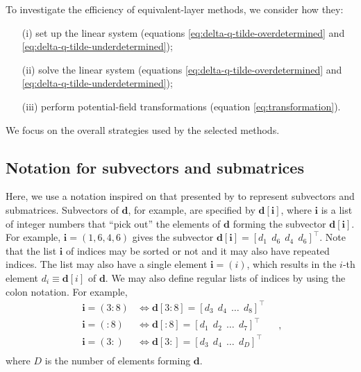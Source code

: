 To investigate the efficiency of equivalent-layer methods, we consider how they:
\begin{itemize}
	\item[(i)] set up the linear system (equations \ref{eq:delta-q-tilde-overdetermined} and \ref{eq:delta-q-tilde-underdetermined});
	\item[(ii)] solve the linear system (equations \ref{eq:delta-q-tilde-overdetermined} and \ref{eq:delta-q-tilde-underdetermined});
	\item[(iii)] perform potential-field transformations (equation \ref{eq:transformation}).
\end{itemize}
We focus on the overall strategies used by the selected methods.

\subsection{Notation for subvectors and submatrices}

Here, we use a notation inspired on that presented by \cite[][p. 4]{vanloan1992} to represent subvectors and submatrices.
Subvectors of $\mathbf{d}$, for example, are specified by $\mathbf{d}[\mathbf{i}]$, where $\mathbf{i}$ is a
list of integer numbers that ``pick out'' the elements of $\mathbf{d}$ forming the subvector $\mathbf{d}[\mathbf{i}]$.
For example, $\mathbf{i} = (1, 6, 4, 6)$ gives the subvector $\mathbf{d}[\mathbf{i}] = [ d_{1} \:\: d_{6} \:\: d_{4} \:\: d_{6} ]^{\top} $.
Note that the list $\mathbf{i}$ of indices may be sorted or not and it may also have repeated indices.
The list may also have a single element $\mathbf{i} = (i)$, which results in the $i$-th element $d_{i} \equiv \mathbf{d}[i]$ of $\mathbf{d}$.
We may also define regular lists of indices by using the colon notation. For example, 
\begin{equation*}
	\begin{split}
		\mathbf{i} = (3:8) &\Leftrightarrow \mathbf{d}[3:8] = [ d_{3} \:\: d_{4} \:\: \dots \:\: d_{8} ]^{\top} \\
		\mathbf{i} = (:8) &\Leftrightarrow \mathbf{d}[:8] = [ d_{1} \:\: d_{2} \:\: \dots \:\: d_{7} ]^{\top} \\
		\mathbf{i} = (3:) &\Leftrightarrow \mathbf{d}[3:] = [ d_{3} \:\: d_{4} \:\: \dots \:\: d_{D} ]^{\top} \\
	\end{split} \quad ,
\end{equation*}
where $D$ is the number of elements forming $\mathbf{d}$.

